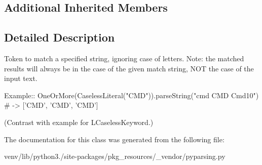 \subsection*{Additional Inherited Members}


\subsection{Detailed Description}
\begin{DoxyVerb}Token to match a specified string, ignoring case of letters.
Note: the matched results will always be in the case of the given
match string, NOT the case of the input text.

Example::
    OneOrMore(CaselessLiteral("CMD")).parseString("cmd CMD Cmd10") # -> ['CMD', 'CMD', 'CMD']
    
(Contrast with example for L{CaselessKeyword}.)
\end{DoxyVerb}
 

The documentation for this class was generated from the following file\+:\begin{DoxyCompactItemize}
\item 
venv/lib/python3./site-\/packages/pkg\+\_\+resources/\+\_\+vendor/pyparsing.\+py\end{DoxyCompactItemize}
